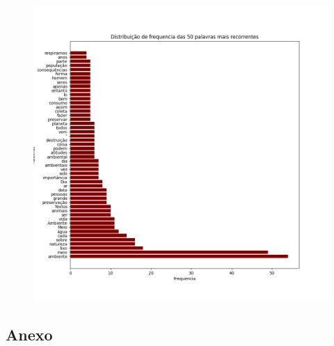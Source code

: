 \documentclass[
   article,       %
   12pt,          %
   oneside,       %
   a4paper,       %
   english,       %
   brazil,           %
   sumario=tradicional
   ]{abntex2}
\begin{document}
\newpage
\begin{figure}
   \centering
   \includegraphics[width=\linewidth]{Figure_1_dist_pal}
   \label{Quantitativo da frequência dos 50 termos mais recorrentes.}
\end{figure}



\postextual
\newpage


\newpage

\begin{anexosenv}
\section{Anexo}

\end{anexosenv}
\end{document}
